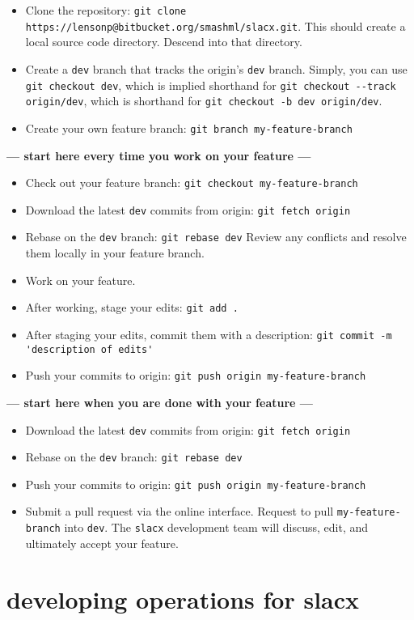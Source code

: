 \begin{itemize} 
\item Clone the repository: \verb|git clone https://lensonp@bitbucket.org/smashml/slacx.git|.
    This should create a local source code directory.
    Descend into that directory.
\item Create a \verb|dev| branch that tracks the origin's \verb|dev| branch.
    Simply, you can use \verb|git checkout dev|, which is implied shorthand for
    \verb|git checkout --track origin/dev|, which is shorthand for
    \verb|git checkout -b dev origin/dev|. 
\item Create your own feature branch: \verb|git branch my-feature-branch| 
\end{itemize} 
\textbf{--- start here every time you work on your feature ---}
\begin{itemize} 
\item Check out your feature branch: \verb|git checkout my-feature-branch|
\item Download the latest \verb|dev| commits from origin: \verb|git fetch origin| 
\item Rebase on the \verb|dev| branch: \verb|git rebase dev|
    Review any conflicts and resolve them locally in your feature branch.
\item Work on your feature.
\item After working, stage your edits: \verb|git add .|
\item After staging your edits, commit them with a description: 
    \verb|git commit -m 'description of edits'|
\item Push your commits to origin: \verb|git push origin my-feature-branch|
\end{itemize} 
\textbf{--- start here when you are done with your feature ---}
\begin{itemize} 
\item Download the latest \verb|dev| commits from origin: \verb|git fetch origin| 
\item Rebase on the \verb|dev| branch: \verb|git rebase dev|
\item Push your commits to origin: \verb|git push origin my-feature-branch|
\item Submit a pull request via the online interface.
    Request to pull \verb|my-feature-branch| into \verb|dev|.
    The \verb|slacx| development team will discuss, edit, 
    and ultimately accept your feature.
\end{itemize} 

\section{developing operations for slacx}
\label{sec:op_dev}

